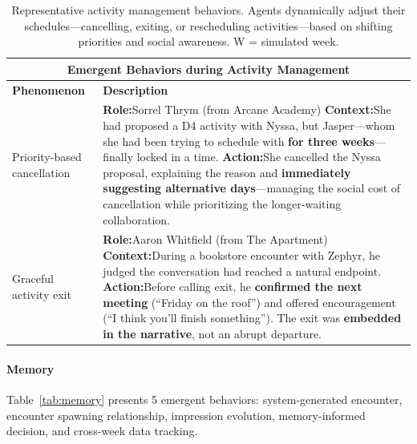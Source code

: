 \begin{table}[t]
\centering
\small
\caption{Representative activity management behaviors. Agents dynamically adjust their schedules---cancelling, exiting, or rescheduling activities---based on shifting priorities and social awareness. W = simulated week.}
\label{tab:activity-mgmt}
\begin{tabular}{p{0.8in}p{4.3in}}
\toprule
\multicolumn{2}{c}{\textbf{Emergent Behaviors during Activity Management}} \\
\midrule
\textbf{Phenomenon} & \textbf{Description} \\
\midrule

Priority-\newline based \newline cancellation
&
\textbf{Role:}\quad Sorrel Thrym \hfill (from Arcane Academy) \newline
\textbf{Context:}\quad She had proposed a D4 activity with Nyssa, but Jasper---whom she had been trying to schedule with \textbf{for three weeks}---finally locked in a time. \newline
\textbf{Action:}\quad She cancelled the Nyssa proposal, explaining the reason and \textbf{immediately suggesting alternative days}---managing the social cost of cancellation while prioritizing the longer-waiting collaboration.
\\
\midrule

Graceful \newline activity exit
&
\textbf{Role:}\quad Aaron Whitfield \hfill (from The Apartment) \newline
\textbf{Context:}\quad During a bookstore encounter with Zephyr, he judged the conversation had reached a natural endpoint. \newline
\textbf{Action:}\quad Before calling exit, he \textbf{confirmed the next meeting} (``Friday on the roof'') and offered encouragement (``I think you'll finish something''). The exit was \textbf{embedded in the narrative}, not an abrupt departure.
\\
\bottomrule
\end{tabular}
\end{table}

\paragraph{Memory}
Table~\ref{tab:memory} presents 5 emergent behaviors:
system-generated encounter, encounter spawning relationship, impression evolution, memory-informed decision, and cross-week data tracking.

